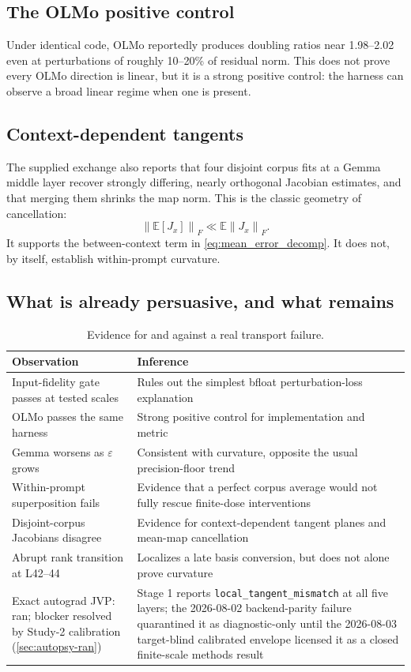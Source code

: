 \documentclass[11pt]{article}
\newcommand{\E}{\mathbb{E}}
\newcommand{\Norm}[1]{\left\lVert #1 \right\rVert}
\newcommand{\eps}{\varepsilon}
\theoremstyle{definition}
\theoremstyle{remark}
\begin{document}
\subsection{The OLMo positive control}
Under identical code, OLMo reportedly produces doubling ratios near 1.98--2.02 even at perturbations of roughly 10--20\% of residual norm. This does not prove every OLMo direction is linear, but it is a strong positive control: the harness can observe a broad linear regime when one is present.

\subsection{Context-dependent tangents}
The supplied exchange also reports that four disjoint corpus fits at a Gemma middle layer recover strongly differing, nearly orthogonal Jacobian estimates, and that merging them shrinks the map norm. This is the classic geometry of cancellation:
\[
  \Norm{\E[J_x]}_F \ll \E\Norm{J_x}_F.
\]
It supports the between-context term in \cref{eq:mean_error_decomp}. It does not, by itself, establish within-prompt curvature.

\subsection{What is already persuasive, and what remains}
\begin{table}[H]
\centering
\small
\caption{Evidence for and against a real transport failure.}
\begin{tabularx}{\textwidth}{@{}p{}X@{}}
\toprule
\textbf{Observation} & \textbf{Inference}\\
\midrule
Input-fidelity gate passes at tested scales & Rules out the simplest bfloat perturbation-loss explanation\\
OLMo passes the same harness & Strong positive control for implementation and metric\\
Gemma worsens as $\eps$ grows & Consistent with curvature, opposite the usual precision-floor trend\\
Within-prompt superposition fails & Evidence that a perfect corpus average would not fully rescue finite-dose interventions\\
Disjoint-corpus Jacobians disagree & Evidence for context-dependent tangent planes and mean-map cancellation\\
Abrupt rank transition at L42--44 & Localizes a late basis conversion, but does not alone prove curvature\\
Exact autograd JVP: ran; blocker resolved by Study-2 calibration (\cref{sec:autopsy-ran}) & Stage 1 reports \texttt{local\_tangent\_mismatch} at all five layers; the 2026-08-02 backend-parity failure quarantined it as diagnostic-only until the 2026-08-03 target-blind calibrated envelope licensed it as a closed finite-scale methods result\\
\bottomrule
\end{tabularx}
\end{table}
\end{document}
